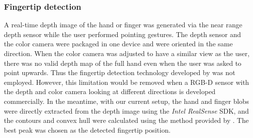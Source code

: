 \subsubsection{Fingertip detection}
A real-time depth image of the hand or finger was generated via the near range depth sensor while the user performed pointing gestures. The depth sensor and the color camera were packaged in one device and were oriented in the same direction. When the color camera was adjusted to have a similar view as the user, there was no valid depth map of the full hand even when the user was asked to point upwards. Thus the fingertip detection technology developed by \citet{Betancourt2015a} was not employed. However, this limitation would be removed when a RGB-D sensor with the depth and color camera looking at different directions is developed commercially. In the meantime, with our current setup, the hand and finger blobs were directly extracted from the depth image using the \textit{Intel RealSense} SDK, and the contours and convex hull were calculated using the method provided by \citet{Suzuki1985}. The best peak was chosen as the detected fingertip position.

